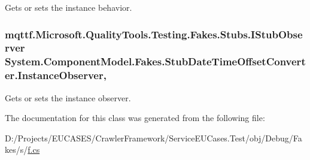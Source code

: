 Gets or sets the instance behavior.

\hypertarget{class_system_1_1_component_model_1_1_fakes_1_1_stub_date_time_offset_converter_a9f0b7e676014a0ecf102361358508bf5}{
\subsubsection[{Instance\-Observer}]{\setlength{\rightskip}{0pt plus 5cm}mqttf.\-Microsoft.\-Quality\-Tools.\-Testing.\-Fakes.\-Stubs.\-I\-Stub\-Observer System.\-Component\-Model.\-Fakes.\-Stub\-Date\-Time\-Offset\-Converter.\-Instance\-Observer\hspace{0.3cm}{\ttfamily [get]}, {\ttfamily [set]}}}\label{class_system_1_1_component_model_1_1_fakes_1_1_stub_date_time_offset_converter_a9f0b7e676014a0ecf102361358508bf5}


Gets or sets the instance observer.



The documentation for this class was generated from the following file\-:\begin{DoxyCompactItemize}
\item 
D\-:/\-Projects/\-E\-U\-C\-A\-S\-E\-S/\-Crawler\-Framework/\-Service\-E\-U\-Cases.\-Test/obj/\-Debug/\-Fakes/s/\hyperlink{s_2f_8cs}{f.\-cs}\end{DoxyCompactItemize}
